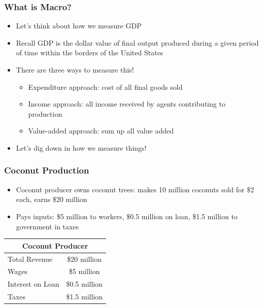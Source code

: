 \documentclass{beamer}
\author{Trevor S. Gallen}
\date{}
\begin{document}
\renewcommand*{\inserttotalframenumber}{\pageref{lastframe}}



\begin{frame}
\titlepage
\end{frame}

\begin{frame}
\frametitle[alignment=center]{What is Macro?}
\begin{itemize}
\item Let's think about how we measure GDP
\bigskip
\item Recall GDP is the dollar value of final output produced during a given period of time within the borders of the United States
\bigskip
\item There are three ways to measure this!
\begin{itemize}
\item Expenditure approach:  cost of all final goods sold
\item Income approach:  all income received by agents contributing to production
\item Value-added approach: sum up all value added 
\end{itemize}
\item Let's dig down in how we measure things!
\end{itemize}
\end{frame}

\begin{frame}
\frametitle[alignment=center]{Coconut Production}
\begin{itemize}
\item Coconut producer owns coconut trees: makes 10 million coconuts sold for \$2 each, earns \$20 million
\bigskip
\item Pays inputs:  \$5 million to workers, \$0.5 million on loan, \$1.5 million to government in taxes
\end{itemize}
\begin{table}
\begin{tabular}{lc}
\hline\hline
\multicolumn{2}{c}{Coconut Producer}\\
\hline
Total Revenue & \$20 million\\
Wages & \$5 million\\
Interest on Loan & \$0.5 million\\
Taxes & \$1.5 million\\
\hline\hline
\end{tabular}
\end{table}
\end{frame}
\end{document}
